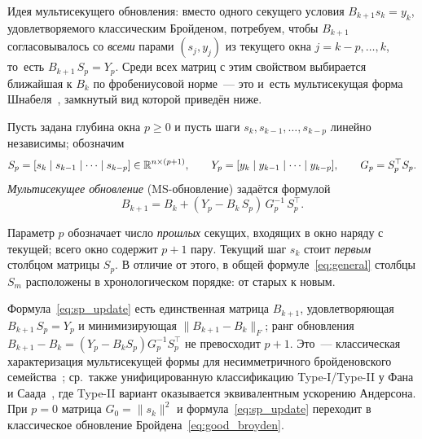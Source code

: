 \medskip

Идея мультисекущего обновления: вместо одного секущего условия
$B_{k+1} s_k = y_k$, удовлетворяемого классическим Бройденом, потребуем,
чтобы $B_{k+1}$ согласовывалось со \emph{всеми} парами $(s_j, y_j)$ из
текущего окна $j = k{-}p, \ldots, k$, то~есть
$B_{k+1}\,S_p = Y_p$. Среди всех матриц с этим свойством выбирается
ближайшая к $B_k$ по фробениусовой норме~--- это и~есть мультисекущая
форма Шнабеля~\cite{schnabel1983}, замкнутый вид которой приведён
ниже.

\begin{definition}\label{def:sp_update}
Пусть задана глубина окна $p \geq 0$ и пусть шаги
$s_k, s_{k-1}, \ldots, s_{k-p}$ линейно независимы; обозначим
\[
  S_p = [s_k \mid s_{k-1} \mid \cdots \mid s_{k-p}] \in \mathbb{R}^{n\times(p+1)},
  \qquad
  Y_p = [y_k \mid y_{k-1} \mid \cdots \mid y_{k-p}],
  \qquad
  G_p = S_p^\top S_p.
\]
\emph{Мультисекущее обновление} (MS-обновление) задаётся формулой
\begin{equation}\label{eq:sp_update}
  B_{k+1} = B_k + (Y_p - B_k\,S_p)\,G_p^{-1}\,S_p^\top.
\end{equation}
\end{definition}

\begin{remark}\label{rem:notation}
Параметр $p$ обозначает число \emph{прошлых} секущих, входящих в окно
наряду с текущей; всего окно содержит $p+1$ пару. Текущий шаг $s_k$
стоит \emph{первым} столбцом матрицы $S_p$. В отличие от этого,
в общей формуле~\eqref{eq:general} столбцы $S_m$ расположены в
хронологическом порядке: от старых к новым.
\end{remark}

\begin{remark}\label{rem:ms_minfrob}
Формула~\eqref{eq:sp_update} есть единственная матрица $B_{k+1}$,
удовлетворяющая $B_{k+1}\,S_p = Y_p$ и минимизирующая $\|B_{k+1} - B_k\|_F$;
ранг обновления $B_{k+1} - B_k = (Y_p - B_k S_p) G_p^{-1} S_p^\top$ не
превосходит $p+1$. Это~--- классическая характеризация мультисекущей
формы для несимметричного бройденовского семейства~\cite[ур.~(2.5)]{schnabel1983};
ср.~также унифицированную классификацию Type-I/Type-II у Фана и
Саада~\cite{fang2009}, где Type-II вариант оказывается
эквивалентным ускорению Андерсона.
При $p=0$ матрица $G_0 = \|s_k\|^2$ и формула~\eqref{eq:sp_update}
переходит в классическое обновление Бройдена~\eqref{eq:good_broyden}.
\end{remark}

